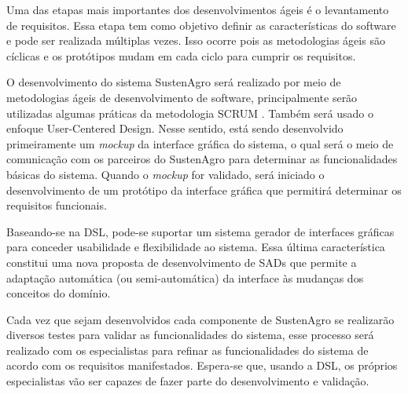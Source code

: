 Uma das etapas mais importantes dos desenvolvimentos ágeis é o levantamento
de requisitos. Essa etapa tem como objetivo definir as características
do software e pode ser realizada múltiplas vezes. Isso ocorre pois
as metodologias ágeis são cíclicas e os protótipos mudam em cada ciclo
para cumprir os requisitos.

O desenvolvimento do sistema SustenAgro será realizado por meio de
metodologias ágeis de desenvolvimento de software, principalmente
serão utilizadas algumas práticas da metodologia SCRUM \citep{schwaber2002gile}.
Também será usado o enfoque User-Centered Design. Nesse sentido, está
sendo desenvolvido primeiramente um \emph{mockup} da interface gráfica
do sistema, o qual será o meio de comunicação com os parceiros do
SustenAgro para determinar as funcionalidades básicas do sistema.
Quando o \emph{mockup} for validado, será iniciado o desenvolvimento
de um protótipo da interface gráfica que permitirá determinar os requisitos
funcionais.

Baseando-se na DSL, pode-se suportar um sistema gerador de interfaces
gráficas para conceder usabilidade e flexibilidade ao sistema. Essa
última característica constitui uma nova proposta de desenvolvimento
de SADs que permite a adaptação automática (ou semi\nobreakdash-automática)
da interface às mudanças dos conceitos do domínio.

Cada vez que sejam desenvolvidos cada componente de SustenAgro se
realizarão diversos testes para validar as funcionalidades do sistema,
esse processo será realizado com os especialistas para refinar as
funcionalidades do sistema de acordo com os requisitos manifestados.
Espera-se que, usando a DSL, os próprios especialistas vão ser capazes
de fazer parte do desenvolvimento e validação.

